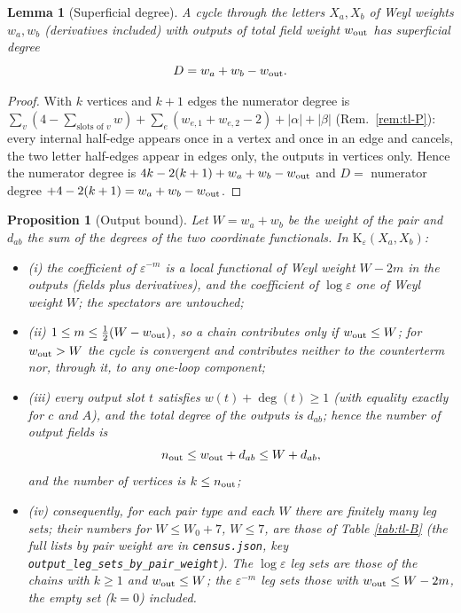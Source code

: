 \documentclass[11pt]{article}
\numberwithin{equation}{section}
\theoremstyle{plain}
\newtheorem{proposition}[theorem]{Proposition}
\newtheorem{lemma}[theorem]{Lemma}
\theoremstyle{definition}
\begin{document}
\begin{lemma}[Superficial degree]
\label{lem:tl-degree}
A cycle through the letters $X_a,X_b$ of Weyl weights $w_a,w_b$ (derivatives included) with outputs of total field weight $w_{\rm out}$ has superficial degree
\[
D=w_a+w_b-w_{\rm out}.
\]
\end{lemma}

\begin{proof}
With $k$ vertices and $k+1$ edges the numerator degree is $\sum_v(4-\sum_{\text{slots of }v}w)+\sum_e(w_{e,1}+w_{e,2}-2)+|\alpha|+|\beta|$ (Rem.~\ref{rem:tl-P}): every internal half-edge appears once in a vertex and once in an edge and cancels, the two letter half-edges appear in edges only, the outputs in vertices only. Hence the numerator degree is $4k-2(k+1)+w_a+w_b-w_{\rm out}$ and $D=$ numerator degree $+4-2(k+1)=w_a+w_b-w_{\rm out}$.
\end{proof}

\begin{proposition}[Output bound]
\label{prop:tl-bound}
Let $W=w_a+w_b$ be the weight of the pair and $d_{ab}$ the sum of the degrees of the two coordinate functionals. In $\mathrm K_\varepsilon(X_a,X_b)$:
\begin{itemize}
\item (i) the coefficient of $\varepsilon^{-m}$ is a local functional of Weyl weight $W-2m$ in the outputs (fields plus derivatives), and the coefficient of $\log\varepsilon$ one of Weyl weight $W$; the spectators are untouched;
\item (ii) $1\le m\le\frac12(W-w_{\rm out})$, so a chain contributes only if $w_{\rm out}\le W$; for $w_{\rm out}>W$ the cycle is convergent and contributes neither to the counterterm nor, through it, to any one-loop component;
\item (iii) every output slot $t$ satisfies $w(t)+\deg(t)\ge1$ (with equality exactly for $c$ and $A$), and the total degree of the outputs is $d_{ab}$; hence the number of output fields is
\[
n_{\rm out}\le w_{\rm out}+d_{ab}\le W+d_{ab},
\]
and the number of vertices is $k\le n_{\rm out}$;
\item (iv) consequently, for each pair type and each $W$ there are finitely many leg sets; their numbers for $W\le W_0+7$, $W\le7$, are those of Table \ref{tab:tl-B} (the full lists by pair weight are in \texttt{census.json}, key \texttt{output\_leg\_sets\_by\_pair\_weight}). The $\log\varepsilon$ leg sets are those of the chains with $k\ge1$ and $w_{\rm out}\le W$; the $\varepsilon^{-m}$ leg sets those with $w_{\rm out}\le W-2m$, the empty set ($k=0$) included.
\end{itemize}
\end{proposition}
\end{document}
